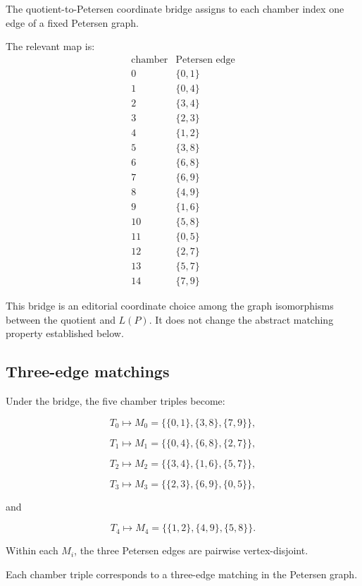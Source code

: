 The quotient-to-Petersen coordinate bridge assigns to each chamber
index one edge of a fixed Petersen graph.

The relevant map is:
\[
\begin{array}{c|c}
\text{chamber} & \text{Petersen edge}\\
\hline
0 & \{0,1\}\\
1 & \{0,4\}\\
2 & \{3,4\}\\
3 & \{2,3\}\\
4 & \{1,2\}\\
5 & \{3,8\}\\
6 & \{6,8\}\\
7 & \{6,9\}\\
8 & \{4,9\}\\
9 & \{1,6\}\\
10 & \{5,8\}\\
11 & \{0,5\}\\
12 & \{2,7\}\\
13 & \{5,7\}\\
14 & \{7,9\}
\end{array}
\]

This bridge is an editorial coordinate choice among the graph
isomorphisms between the quotient and \(L(P)\). It does not change the
abstract matching property established below.

\subsection{Three-edge matchings}

Under the bridge, the five chamber triples become:

\[
T_0
\longmapsto
M_0=
\bigl\{
\{0,1\},
\{3,8\},
\{7,9\}
\bigr\},
\]

\[
T_1
\longmapsto
M_1=
\bigl\{
\{0,4\},
\{6,8\},
\{2,7\}
\bigr\},
\]

\[
T_2
\longmapsto
M_2=
\bigl\{
\{3,4\},
\{1,6\},
\{5,7\}
\bigr\},
\]

\[
T_3
\longmapsto
M_3=
\bigl\{
\{2,3\},
\{6,9\},
\{0,5\}
\bigr\},
\]

and

\[
T_4
\longmapsto
M_4=
\bigl\{
\{1,2\},
\{4,9\},
\{5,8\}
\bigr\}.
\]

Within each \(M_i\), the three Petersen edges are pairwise
vertex-disjoint.

\begin{theorem}
Each chamber triple corresponds to a three-edge matching in the
Petersen graph.
\end{theorem}

